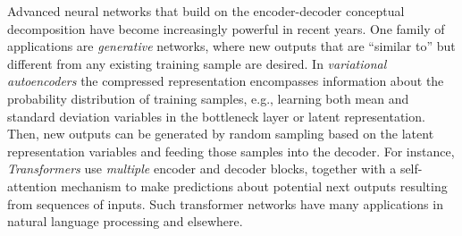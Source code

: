 Advanced neural networks that build on the encoder-decoder conceptual
decomposition have become increasingly powerful in recent years. One
family of applications are {\em generative}
networks, where new outputs that are ``similar to'' but different from
any existing training sample are desired. In {\em variational
    autoencoders} the compressed
representation encompasses information about the probability
distribution of training samples, e.g., learning both mean and
standard deviation variables in the bottleneck layer or latent
representation. Then, new outputs can be generated by random sampling
based on the latent representation variables and feeding those samples
into the decoder. For instance, {\em Transformers} use {\em multiple} encoder and
decoder blocks, together with a self-attention mechanism to make predictions
about potential next outputs resulting from sequences of inputs. Such
transformer networks have many applications in natural language
processing and elsewhere.

